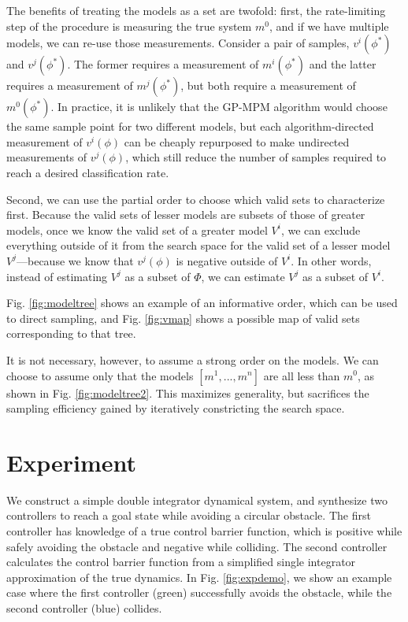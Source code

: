 \documentclass[letterpaper, 10 pt, conference]{ieeeconf}  %
\begin{document}
The benefits of treating the models as a set are twofold: first, the rate-limiting step of the procedure is measuring the true system $m^0$, and if we have multiple models, we can re-use those measurements. Consider a pair of samples, $v^i(\phi^*)$ and $v^j(\phi^*)$. The former requires a measurement of $m^i(\phi^*)$ and the latter requires a measurement of $m^j(\phi^*)$, but both require a measurement of $m^0(\phi^*)$. In practice, it is unlikely that the GP-MPM algorithm would choose the same sample point for two different models, but each algorithm-directed measurement of $v^i(\phi)$ can be cheaply repurposed to make undirected measurements of $v^j(\phi)$, which still reduce the number of samples required to reach a desired classification rate.

Second, we can use the partial order to choose which valid sets to characterize first. Because the valid sets of lesser models are subsets of those of greater models, once we know the valid set of a greater model $V^i$, we can exclude everything outside of it from the search space for the valid set of a lesser model $V^j$---because we know that $v^j(\phi)$ is negative outside of $V^i$. In other words, instead of estimating $V^j$ as a subset of $\Phi$, we can estimate $V^j$ as a subset of $V^i$.

Fig. \ref{fig:modeltree} shows an example of an informative order, which can be used to direct sampling, and Fig. \ref{fig:vmap} shows a possible map of valid sets corresponding to that tree.

It is not necessary, however, to assume a strong order on the models. We can choose to assume only that the models $[m^1,...,m^n]$ are all less than $m^0$, as shown in Fig. \ref{fig:modeltree2}. This maximizes generality, but sacrifices the sampling efficiency gained by iteratively constricting the search space.

\section{Experiment}

We construct a simple double integrator dynamical system, and synthesize two controllers to reach a goal state while avoiding a circular obstacle. The first controller has knowledge of a true control barrier function, which is positive while safely avoiding the obstacle and negative while colliding. The second controller calculates the control barrier function from a simplified single integrator approximation of the true dynamics. In Fig. \ref{fig:expdemo}, we show an example case where the first controller (green) successfully avoids the obstacle, while the second controller (blue) collides.
\end{document}
